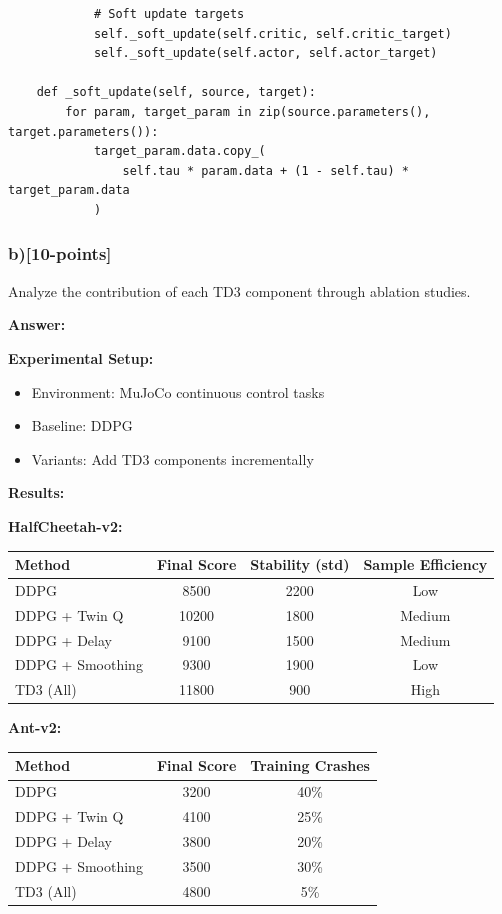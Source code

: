 \documentclass[12pt]{article}
\begin{document}
{{\begin{verbatim}
            # Soft update targets
            self._soft_update(self.critic, self.critic_target)
            self._soft_update(self.actor, self.actor_target)

    def _soft_update(self, source, target):
        for param, target_param in zip(source.parameters(), target.parameters()):
            target_param.data.copy_(
                self.tau * param.data + (1 - self.tau) * target_param.data
            )
\end{verbatim}

\subsubsection{b)[10-points]} Analyze the contribution of each TD3 component through ablation studies.

\textbf{Answer:}

\textbf{Experimental Setup:}
\begin{itemize}
\item Environment: MuJoCo continuous control tasks
\item Baseline: DDPG
\item Variants: Add TD3 components incrementally
\end{itemize}

\textbf{Results:}

\textbf{HalfCheetah-v2:}
\begin{center}
\begin{tabular}{|l|c|c|c|}
\hline
\textbf{Method} & \textbf{Final Score} & \textbf{Stability (std)} & \textbf{Sample Efficiency} \\
\hline
DDPG & 8500 & 2200 & Low \\
DDPG + Twin Q & 10200 & 1800 & Medium \\
DDPG + Delay & 9100 & 1500 & Medium \\
DDPG + Smoothing & 9300 & 1900 & Low \\
TD3 (All) & 11800 & 900 & High \\
\hline
\end{tabular}
\end{center}

\textbf{Ant-v2:}
\begin{center}
\begin{tabular}{|l|c|c|}
\hline
\textbf{Method} & \textbf{Final Score} & \textbf{Training Crashes} \\
\hline
DDPG & 3200 & 40\% \\
DDPG + Twin Q & 4100 & 25\% \\
DDPG + Delay & 3800 & 20\% \\
DDPG + Smoothing & 3500 & 30\% \\
TD3 (All) & 4800 & 5\% \\
\hline
\end{tabular}
\end{center}

}}
\end{document}
